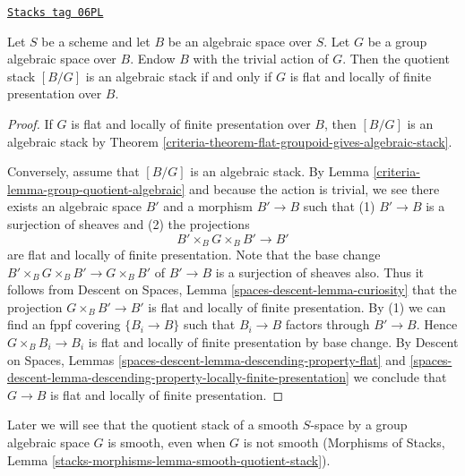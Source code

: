 \begin{lemma}
\label{criteria-lemma-BG-algebraic}
\href{https://stacks.math.columbia.edu/tag/06PL}{\texttt{Stacks tag 06PL}}


Let $S$ be a scheme and let $B$ be an algebraic space over $S$.
Let $G$ be a group algebraic space over $B$.
Endow $B$ with the trivial action of $G$.
Then the quotient stack $[B/G]$ is an algebraic stack
if and only if $G$ is flat and locally of finite presentation over $B$.
\end{lemma}

\begin{proof}

If $G$ is flat and locally of finite presentation over $B$, then
$[B/G]$ is an algebraic stack by
Theorem \ref{criteria-theorem-flat-groupoid-gives-algebraic-stack}.

\medskip\noindent
Conversely, assume that $[B/G]$ is an algebraic stack. By
Lemma \ref{criteria-lemma-group-quotient-algebraic}
and because the action is trivial, we see
there exists an algebraic space $B'$ and a morphism
$B' \to B$ such that (1) $B' \to B$ is a surjection
of sheaves and (2) the projections
$$
B' \times_B G \times_B B' \to B'
$$
are flat and locally of finite presentation. Note that the base change
$B' \times_B G \times_B B' \to G \times_B B'$ of $B' \to B$
is a surjection of sheaves also. Thus it follows from
Descent on Spaces, Lemma \ref{spaces-descent-lemma-curiosity}
that the projection $G \times_B B' \to B'$ is flat and locally
of finite presentation. By (1) we can find an fppf covering
$\{B_i \to B\}$ such that $B_i \to B$ factors through $B' \to B$.
Hence $G \times_B B_i \to B_i$ is flat and locally of finite presentation
by base change. By
Descent on Spaces, Lemmas
\ref{spaces-descent-lemma-descending-property-flat} and
\ref{spaces-descent-lemma-descending-property-locally-finite-presentation}
we conclude that $G \to B$ is flat and locally of finite presentation.
\end{proof}

Later we will see that the quotient stack of a smooth $S$-space
by a group algebraic space $G$ is smooth, even when $G$ is not smooth
(Morphisms of Stacks, Lemma
\ref{stacks-morphisms-lemma-smooth-quotient-stack}).

